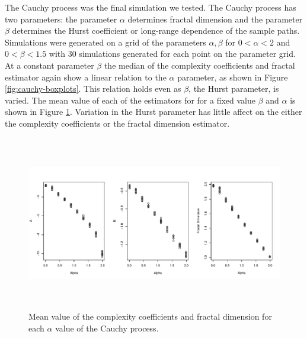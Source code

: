 The Cauchy process was the final simulation we tested.
The Cauchy process has two parameters: the 
parameter $\alpha$ determines
fractal dimension and the parameter $\beta$ determines 
the Hurst coefficient or long-range dependence of 
the sample paths. Simulations were generated on a 
grid of the parameters $\alpha, \beta$ 
for $0 < \alpha < 2$ and $0 < \beta < 1.5$ with 30 simulations
generated for each point on the parameter grid. At a 
constant parameter $\beta$ the median of the complexity 
coefficients and fractal estimator again show a linear
relation to the $\alpha$ parameter, as shown 
in Figure \ref{fig:cauchy-boxplots}. This relation holds 
even as $\beta$, the Hurst parameter, is varied. The 
mean value of each of the estimators for for a fixed 
value $\beta$ and $\alpha$ is shown in Figure 
\ref{fig:cauchy-alpha}. Variation in the Hurst parameter
has little affect on the either the complexity coefficients
or the fractal dimension estimator.


\begin{figure}[!htbp]
  \begin{center}
  \includegraphics[height = 3in, width =6in, keepaspectratio]{./figs/cauchyalpha-scatterplots.pdf}
  \end{center}
  \caption{Mean value of the complexity coefficients and fractal dimension for each $\alpha$ value of the Cauchy process.}
   \label{fig:cauchy-alpha}
\end{figure}

